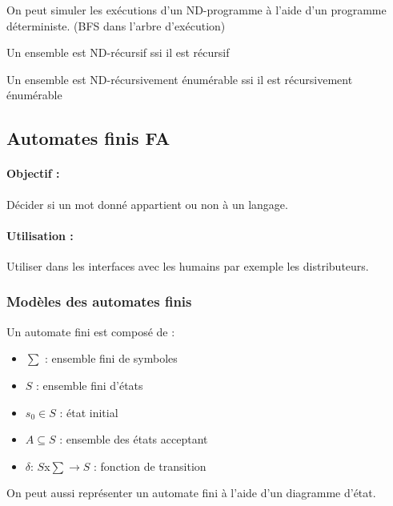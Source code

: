 \begin{myprop}
	On peut simuler les exécutions d'un ND-programme à l'aide d'un programme 
	déterministe. (BFS dans l'arbre d'exécution)
\end{myprop}

\begin{mytheo}
	Un ensemble est ND-récursif ssi il est récursif
\end{mytheo}

\begin{mytheo}
	Un ensemble est ND-récursivement énumérable ssi il est récursivement 
	énumérable
\end{mytheo}

\subsection{Automates finis FA}
\label{sub:automates_finis}

\paragraph{Objectif :} Décider si un mot donné appartient ou non à un langage.

\paragraph{Utilisation :} Utiliser dans les interfaces avec les humains par 
exemple les distributeurs.

\subsubsection{Modèles des automates finis}
\label{ssub:mod_les_des_automates_finis}
Un automate fini est composé de :

\begin{itemize}
	\item $\sum$ : ensemble fini de symboles
	\item $S$ : ensemble fini d'états
	\item $s_0 \in S$ : état initial
	\item $A \subseteq S$ : ensemble des états acceptant
	\item $\delta$: $S$x$\sum \rightarrow S$ : fonction de transition
\end{itemize}

\begin{myrem}
	On peut aussi représenter un automate fini à l'aide d'un diagramme 
	d'état.
\end{myrem}

